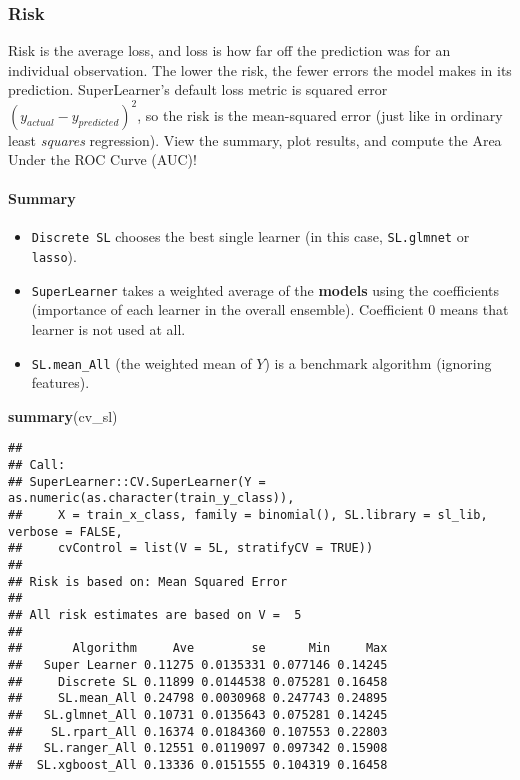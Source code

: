 \documentclass[
]{book}
\newenvironment{Shaded}{\begin{snugshade}}{\end{snugshade}}
\newcommand{\KeywordTok}[1]{\textcolor[rgb]{0.13,0.29,0.53}{\textbf{#1}}}
\newcommand{\NormalTok}[1]{#1}
\providecommand{\tightlist}{%
  \setlength{\itemsep}{0pt}\setlength{\parskip}{0pt}}
\begin{document}
\hypertarget{risk}{%
\subsubsection{Risk}\label{risk}}

Risk is the average loss, and loss is how far off the prediction was for an individual observation. The lower the risk, the fewer errors the model makes in its prediction. SuperLearner's default loss metric is squared error \((y_{actual} - y_{predicted})^2\), so the risk is the mean-squared error (just like in ordinary least \emph{squares} regression). View the summary, plot results, and compute the Area Under the ROC Curve (AUC)!

\hypertarget{summary}{%
\paragraph{Summary}\label{summary}}

\begin{itemize}
\tightlist
\item
  \texttt{Discrete\ SL} chooses the best single learner (in this case, \texttt{SL.glmnet} or \texttt{lasso}).
\item
  \texttt{SuperLearner} takes a weighted average of the \textbf{models} using the coefficients (importance of each learner in the overall ensemble). Coefficient 0 means that learner is not used at all.
\item
  \texttt{SL.mean\_All} (the weighted mean of \(Y\)) is a benchmark algorithm (ignoring features).
\end{itemize}

\begin{Shaded}
\begin{Highlighting}[]
\KeywordTok{summary}\NormalTok{(cv\_sl)}
\end{Highlighting}
\end{Shaded}

\begin{verbatim}
## 
## Call:  
## SuperLearner::CV.SuperLearner(Y = as.numeric(as.character(train_y_class)),  
##     X = train_x_class, family = binomial(), SL.library = sl_lib, verbose = FALSE,  
##     cvControl = list(V = 5L, stratifyCV = TRUE)) 
## 
## Risk is based on: Mean Squared Error
## 
## All risk estimates are based on V =  5 
## 
##       Algorithm     Ave        se      Min     Max
##   Super Learner 0.11275 0.0135331 0.077146 0.14245
##     Discrete SL 0.11899 0.0144538 0.075281 0.16458
##     SL.mean_All 0.24798 0.0030968 0.247743 0.24895
##   SL.glmnet_All 0.10731 0.0135643 0.075281 0.14245
##    SL.rpart_All 0.16374 0.0184360 0.107553 0.22803
##   SL.ranger_All 0.12551 0.0119097 0.097342 0.15908
##  SL.xgboost_All 0.13336 0.0151555 0.104319 0.16458
\end{verbatim}
\end{document}
